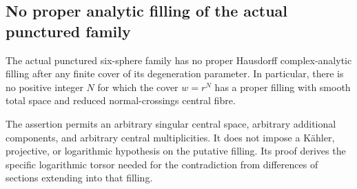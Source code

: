 \subsection{No proper analytic filling of the actual punctured family}

\begin{theorem}
\label{push:B433}
The actual punctured six-sphere family has no proper
Hausdorff complex-analytic filling after any finite
cover of its degeneration parameter. In particular,
there is no positive integer $N$ for which the cover
$w=r^N$ has a proper filling with smooth total space
and reduced normal-crossings central fibre.

The assertion permits an arbitrary singular central
space, arbitrary additional components, and arbitrary
central multiplicities. It does not impose a
K\"ahler, projective, or logarithmic hypothesis on
the putative filling. Its proof derives the specific
logarithmic torsor needed for the contradiction from
differences of sections extending into that filling.
\end{theorem}

